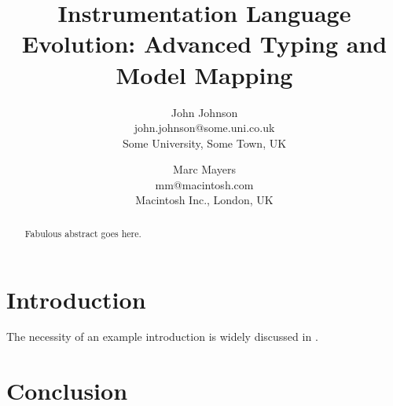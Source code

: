 \documentclass{gistt}
\title{Instrumentation Language Evolution: Advanced Typing and Model Mapping}
\author{John Johnson\\
john.johnson@some.uni.co.uk\\
Some University, Some Town, UK
\and
Marc Mayers\\
mm@macintosh.com\\
Macintosh Inc., London, UK}
\begin{document}
\maketitle

\begin{abstract}
Fabulous abstract goes here.
\end{abstract}

%
\section{Introduction}

The necessity of an example introduction is widely discussed in \cite{Johnson:2003,Mayers:2004}.

%
\section{Conclusion}



\printbibliography
\end{document}
